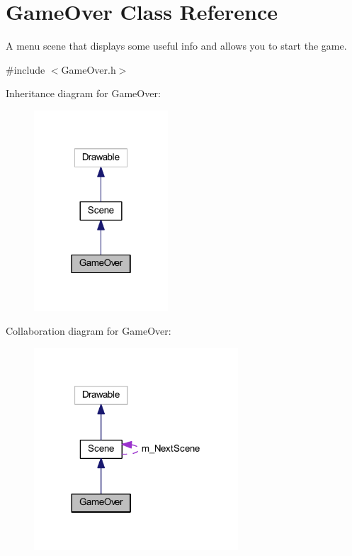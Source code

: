 \hypertarget{class_game_over}{}\section{Game\+Over Class Reference}
\label{class_game_over}


A menu scene that displays some useful info and allows you to start the game.  




{\ttfamily \#include $<$Game\+Over.\+h$>$}



Inheritance diagram for Game\+Over\+:\nopagebreak
\begin{figure}[H]
\begin{center}
\leavevmode
\includegraphics[width=142pt]{class_game_over__inherit__graph}
\end{center}
\end{figure}


Collaboration diagram for Game\+Over\+:\nopagebreak
\begin{figure}[H]
\begin{center}
\leavevmode
\includegraphics[width=216pt]{class_game_over__coll__graph}
\end{center}
\end{figure}
